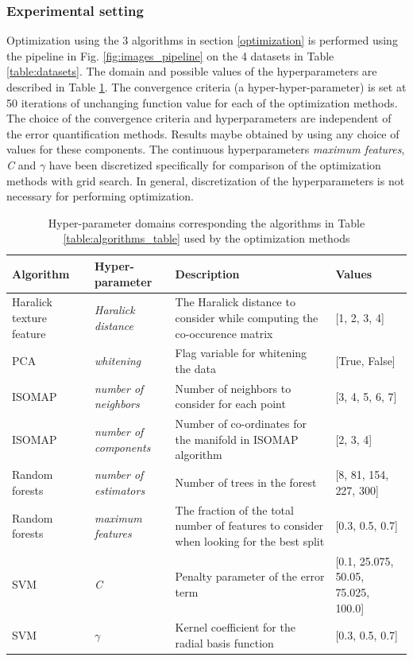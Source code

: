\subsubsection{Experimental setting}
Optimization using the 3 algorithms in section \ref{optimization} is performed using the pipeline in Fig. \ref{fig:images_pipeline} on the 4 datasets in Table \ref{table:datasets}. The domain and possible values of the hyperparameters are described in Table \ref{table:hyper}. 
The convergence criteria (a hyper-hyper-parameter) is set at 50 iterations of unchanging  function value for each of the optimization methods. The choice of the convergence criteria and hyperparameters are independent of the error quantification methods. Results maybe obtained by using any choice of values for these components. The continuous hyperparameters \textit{maximum features}, \textit{C} and $\gamma$ have been discretized specifically for comparison of the optimization methods with grid search. In general, discretization of the hyperparameters is not necessary for performing optimization.
\begin{table}[ht!]
\centering
\caption{Hyper-parameter domains corresponding the algorithms in Table \ref{table:algorithms_table} used by the optimization methods}
\begin{tabularx}{\linewidth}{ |X|X|X|X| } 
 \hline
 Algorithm & Hyper-parameter & Description & Values \\ 
 \hline
 Haralick texture feature & \textit{Haralick distance} & The Haralick distance to consider while computing the co-occurence matrix & [1, 2, 3, 4]\\
 \hline
 PCA & \textit{whitening} & Flag variable for whitening the data & [True, False]\\
 \hline
  ISOMAP & \textit{number of neighbors} & Number of neighbors to consider for each point & [3, 4, 5, 6, 7] \\
 \hline
 ISOMAP & \textit{number of components} & Number of co-ordinates for the manifold in ISOMAP algorithm & [2, 3, 4]\\
 \hline
 Random forests & \textit{number of estimators} & Number of trees in the forest & [8,  81, 154, 227, 300]\\
 \hline
 Random forests & \textit{maximum features} & The fraction of the total number of features to consider when looking for the best split & [0.3, 0.5, 0.7]\\
 \hline
 SVM & \textit{C} & Penalty parameter of the error term & [0.1, 25.075, 50.05, 75.025, 100.0] \\
 \hline
 SVM & $\gamma$ & Kernel coefficient for the radial basis function & [0.3, 0.5, 0.7] \\
 \hline
 \end{tabularx}
 
\label{table:hyper}
\end{table}
